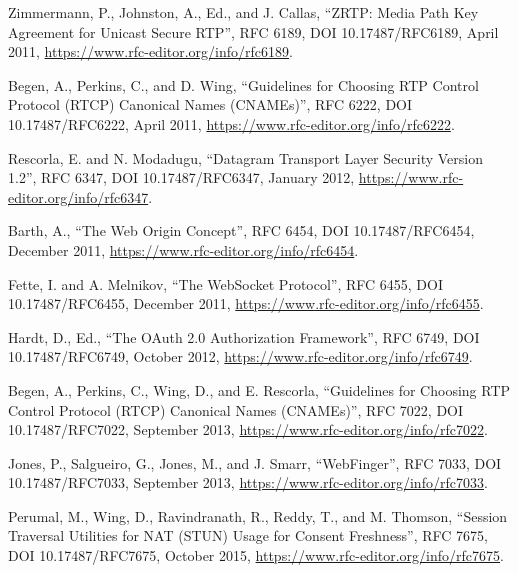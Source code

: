 \documentclass{article}
\begin{document}
\begin{description}[style=nextline, labelwidth=10em, leftmargin=10em]
\item[{[RFC6189]}] Zimmermann, P., Johnston, A., Ed., and J. Callas, ``ZRTP:
   Media Path Key Agreement for Unicast Secure RTP'',
   RFC 6189, DOI 10.17487/RFC6189, April 2011,
   \url{https://www.rfc-editor.org/info/rfc6189}.

\item[{[RFC6222]}] Begen, A., Perkins, C., and D. Wing, ``Guidelines for
   Choosing RTP Control Protocol (RTCP) Canonical Names
   (CNAMEs)'', RFC 6222, DOI 10.17487/RFC6222, April 2011,
   \url{https://www.rfc-editor.org/info/rfc6222}.

\item[{[RFC6347]}] Rescorla, E. and N. Modadugu, ``Datagram Transport Layer
   Security Version 1.2'', RFC 6347, DOI 10.17487/RFC6347,
   January 2012, \url{https://www.rfc-editor.org/info/rfc6347}.

\item[{[RFC6454]}] Barth, A., ``The Web Origin Concept'', RFC 6454,
   DOI 10.17487/RFC6454, December 2011,
   \url{https://www.rfc-editor.org/info/rfc6454}.

\item[{[RFC6455]}] Fette, I. and A. Melnikov, ``The WebSocket Protocol'',
   RFC 6455, DOI 10.17487/RFC6455, December 2011,
   \url{https://www.rfc-editor.org/info/rfc6455}.

\item[{[RFC6749]}] Hardt, D., Ed., ``The OAuth 2.0 Authorization Framework'',
   RFC 6749, DOI 10.17487/RFC6749, October 2012,
   \url{https://www.rfc-editor.org/info/rfc6749}.

\item[{[RFC7022]}] Begen, A., Perkins, C., Wing, D., and E. Rescorla,
   ``Guidelines for Choosing RTP Control Protocol (RTCP)
   Canonical Names (CNAMEs)'', RFC 7022, DOI 10.17487/RFC7022,
   September 2013, \url{https://www.rfc-editor.org/info/rfc7022}.

\item[{[RFC7033]}] Jones, P., Salgueiro, G., Jones, M., and J. Smarr,
   ``WebFinger'', RFC 7033, DOI 10.17487/RFC7033, September
   2013, \url{https://www.rfc-editor.org/info/rfc7033}.

\item[{[RFC7675]}] Perumal, M., Wing, D., Ravindranath, R., Reddy, T., and M.
   Thomson, ``Session Traversal Utilities for NAT (STUN) Usage
   for Consent Freshness'', RFC 7675, DOI 10.17487/RFC7675,
   October 2015, \url{https://www.rfc-editor.org/info/rfc7675}.


\end{description}
\end{document}

